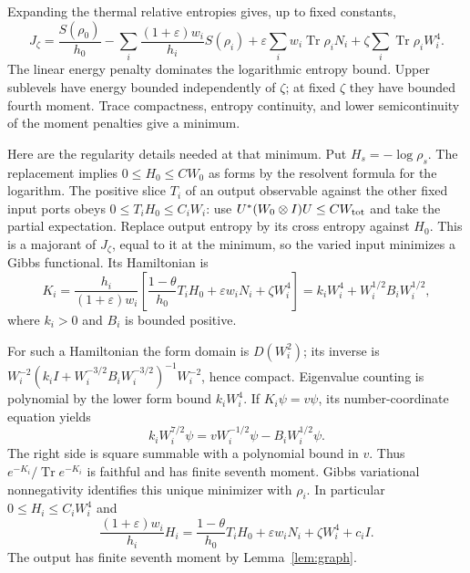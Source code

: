 \documentclass[11pt]{article}
\newcommand{\Tr}{\operatorname{Tr}}
\theoremstyle{remark}\newtheorem{remark}[theorem]{Remark}
\begin{document}
Expanding the thermal relative entropies gives, up to fixed constants,
\[
 J_\zeta=\frac{S(\rho_0)}{h_0}
 -\sum_i\frac{(1+\varepsilon)w_i}{h_i}S(\rho_i)
 +\varepsilon\sum_iw_i\Tr\rho_iN_i+\zeta\sum_i\Tr\rho_iW_i^4.
\]
The linear energy penalty dominates the logarithmic entropy bound.
Upper sublevels have energy bounded independently of $\zeta$; at fixed
$\zeta$ they have bounded fourth moment. Trace compactness, entropy
continuity, and lower semicontinuity of the moment penalties give a minimum.

Here are the regularity details needed at that minimum. Put $H_s=-\log\rho_s$.
The replacement implies $0\le H_0\le CW_0$ as forms by the resolvent
formula for the logarithm. The positive slice $T_i$ of an output observable
against the other fixed input ports obeys $0\le T_iH_0\le C_iW_i$:
use $U^*(W_0\otimes I)U\le C W_{\rm tot}$ and take the partial
expectation. Replace output entropy by its cross entropy against $H_0$.
This is a majorant of $J_\zeta$, equal to it at the minimum, so the varied
input minimizes a Gibbs functional. Its Hamiltonian is
\[
 K_i=\frac{h_i}{(1+\varepsilon)w_i}
 \left[\frac{1-\theta}{h_0}T_iH_0+\varepsilon w_i N_i+\zeta W_i^4\right]
 =k_i W_i^4+W_i^{1/2}B_iW_i^{1/2},
\]
where $k_i>0$ and $B_i$ is bounded positive.

For such a Hamiltonian the form domain is $D(W_i^2)$; its inverse is
$W_i^{-2}(k_iI+W_i^{-3/2}B_iW_i^{-3/2})^{-1}W_i^{-2}$, hence compact.
Eigenvalue counting is polynomial by the lower form bound $k_iW_i^4$.
If $K_i\psi=v\psi$, its number-coordinate equation yields
\[
 k_iW_i^{7/2}\psi=vW_i^{-1/2}\psi-B_iW_i^{1/2}\psi.
\]
The right side is square summable with a polynomial bound in $v$.
Thus $e^{-K_i}/\Tr e^{-K_i}$ is faithful and has finite seventh moment.
Gibbs variational nonnegativity identifies this unique minimizer with
$\rho_i$. In particular $0\le H_i\le C_iW_i^4$ and
\begin{equation}\label{eq:Gibbs}
 \frac{(1+\varepsilon)w_i}{h_i}H_i
 =\frac{1-\theta}{h_0}T_iH_0+\varepsilon w_iN_i+\zeta W_i^4+c_iI.
\end{equation}
The output has finite seventh moment by Lemma~\ref{lem:graph}.
\end{document}
